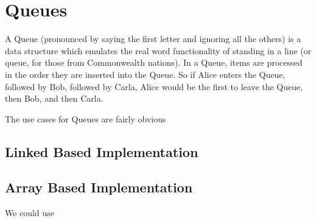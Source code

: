 
\chapter{Queues}
\label{chap-queue}

A Queue (pronounced by saying the first letter and ignoring all the others) is a data structure which emulates the real word functionality of standing in a line (or queue, for those from Commonwealth nations).  
In a Queue, items are processed in the order they are inserted into the Queue.  So if Alice enters the Queue, followed by Bob, followed by Carla, Alice would be the first to leave the Queue, then Bob, and then Carla.

The use cases for Queues are fairly obvious

\section{Linked Based Implementation} 
\section{Array Based Implementation}
We could use 